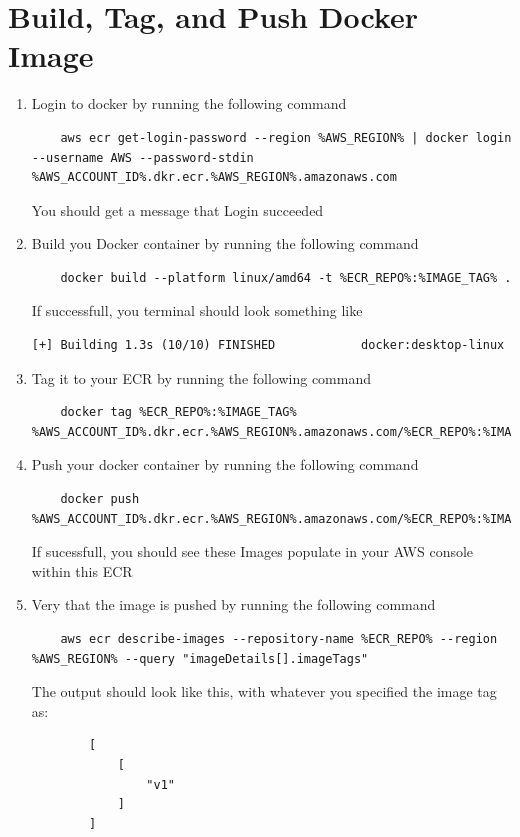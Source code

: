 \section{Build, Tag, and Push Docker Image}
\begin{enumerate}
    \item Login to docker by running the following command
    \begin{verbatim}
    aws ecr get-login-password --region %AWS_REGION% | docker login --username AWS --password-stdin %AWS_ACCOUNT_ID%.dkr.ecr.%AWS_REGION%.amazonaws.com
    \end{verbatim}
    You should get a message that Login succeeded

    \item Build you Docker container by running the following command
    \begin{verbatim}
    docker build --platform linux/amd64 -t %ECR_REPO%:%IMAGE_TAG% .
    \end{verbatim}
    If successfull, you terminal should look something like 
    \begin{verbatim}
[+] Building 1.3s (10/10) FINISHED            docker:desktop-linux
\end{verbatim}

    \item Tag it to your ECR by running the following command
    \begin{verbatim}
    docker tag %ECR_REPO%:%IMAGE_TAG% %AWS_ACCOUNT_ID%.dkr.ecr.%AWS_REGION%.amazonaws.com/%ECR_REPO%:%IMAGE_TAG%
    \end{verbatim}

    \item Push your docker container by running the following command 
    \begin{verbatim}
    docker push %AWS_ACCOUNT_ID%.dkr.ecr.%AWS_REGION%.amazonaws.com/%ECR_REPO%:%IMAGE_TAG%%
    \end{verbatim}
    If sucessfull, you should see these Images populate in your AWS console within this ECR

    \item Very that the image is pushed by running the following command 
    \begin{verbatim}
    aws ecr describe-images --repository-name %ECR_REPO% --region %AWS_REGION% --query "imageDetails[].imageTags"
    \end{verbatim}

    The output should look like this, with whatever you specified the image tag as: 
    \begin{verbatim}
        [
            [
                "v1"
            ]
        ]
        \end{verbatim}

    
    
    
\end{enumerate}
